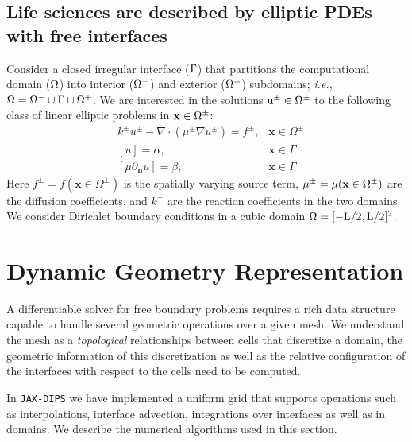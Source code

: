 \documentclass{elsarticle}
\begin{document}
\subsection{Life sciences are described by elliptic PDEs with free interfaces}
Consider a closed irregular interface ($\rm \Gamma$) that partitions the computational domain ($\rm \Omega$) into interior ($\rm \Omega^-$) and exterior ($\rm \Omega^+$) subdomains; \textit{i.e.}, $\rm \Omega=\Omega^- \cup \Gamma \cup \Omega^+$. We are interested in the solutions $\rm u^\pm\in \Omega^\pm$ to the following class of linear elliptic problems in  $\rm \mathbf{x}\in\Omega^\pm$:
\begin{align*}
	 & k^{\pm}u^{\pm} - \nabla \cdot (\mu^{\pm}\nabla u^\pm)=f^{\pm}, & \mathbf{x}\in\Omega^\pm \\
	 & [u]=\alpha,                                                    & \mathbf{x} \in \Gamma   \\
	 & [\mu \partial_{\mathbf{n}}u]=\beta,                            & \mathbf{x} \in \Gamma
\end{align*}
Here $f^\pm=f(\mathbf{x} \in \Omega^\pm)$ is the spatially varying source term, $\rm \mu^\pm=\mu(\mathbf{x} \in \Omega^\pm)$  are the diffusion coefficients, and $k^\pm$ are the reaction coefficients in the two domains. We consider Dirichlet boundary conditions in a cubic domain $\rm \Omega=[-L/2,L/2]^3$.




\section{Dynamic Geometry Representation}
A differentiable solver for free boundary problems requires a rich data structure capable to handle several geometric operations over a given mesh. We understand the mesh as a \textit{topological} relationships between cells that discretize a domain, the geometric information of this discretization as well as the relative configuration of the interfaces with respect to the cells need to be computed. 

In \texttt{JAX-DIPS} we have implemented a uniform grid that supports operations such as interpolations, interface advection, integrations over interfaces as well as in domains. We describe the numerical algorithms used in this section.
\end{document}
